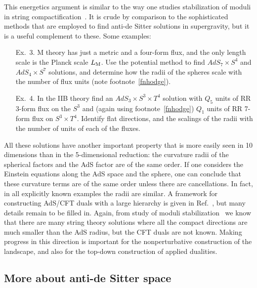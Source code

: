 \documentclass[12pt]{article}
\begin{document}
{This energetics argument is similar to the way one studies stabilization of moduli in string compactification~\cite{Silverstein:2004id}.  It is crude by comparison to the sophisticated methods that are employed to find anti-de Sitter solutions in supergravity, but it is a useful complement to these.  Some examples:

\begin{enumerate}

\item[Ex.\ 3.] M theory has just a metric and a four-form flux, and the only length scale is the Planck scale $L_{\rm M}$.  Use the potential method to find $AdS_7 \times S^4$ and $AdS_4 \times S^7$ solutions, and determine how the radii of the spheres scale with the number of flux units (note footnote~\ref{fnhodge}).

\item[Ex.\ 4.] In the IIB theory find an $AdS_3 \times S^3 \times T^4$ solution with $Q_5$ units of RR 3-form flux on the $S^3$ and (again using footnote~\ref{fnhodge}) $Q_1$ units of RR 7-form flux on $S^3 \times T^4$.  Identify flat directions, and the scalings of the radii with the number of units of each of the fluxes.

\end{enumerate}

All these solutions have another important property that is more easily seen in 10 dimensions than in the 5-dimensional reduction: the curvature radii of the spherical factors and the AdS factor are of the same order.  If one considers the Einstein equations along the AdS space and the sphere, one can conclude that these curvature terms are of the same order unless there are cancellations.  In fact, in all explicitly known examples the radii are similar.  A framework for constructing AdS/CFT duals with a large hierarchy is given in Ref.~\cite{Polchinski:2009ch}, but many details remain to be filled in.  Again, from study of moduli stabilization~\cite{Kachru:2003sx} we know that there are many string theory solutions where all the compact directions are much smaller than the AdS radius, but the CFT duals are not known.  Making progress in this direction is important for the nonperturbative construction of the landscape, and also for the top-down construction of applied dualities.

\subsection{More about anti-de Sitter space}

}
\end{document}
